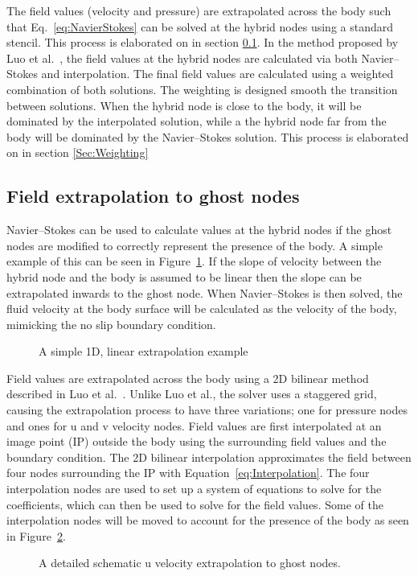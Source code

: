 \documentclass[onehalf,11pt]{beavtex}
\begin{document}
The field values (velocity and pressure) are extrapolated across the body such that Eq.~\eqref{eq:NavierStokes} can be solved at the hybrid nodes using a standard stencil. 
This process is elaborated on in section \ref{Sec:Field Extrapolation}. 
In the method proposed by Luo et al.~\cite{Luo:2012gx}, the field values at the hybrid nodes are calculated via both Navier--Stokes and interpolation. 
The final field values are calculated using a weighted combination of both solutions.
The weighting is designed smooth the transition between solutions. 
When the hybrid node is close to the body, it will be dominated by the interpolated solution, while a the hybrid node far from the body will be dominated by the Navier--Stokes solution. 
This process is elaborated on in section \ref{Sec:Weighting}

\subsection{Field extrapolation to ghost nodes}
\label{Sec:Field Extrapolation}

Navier--Stokes can be used to calculate values at the hybrid nodes if the ghost nodes are modified to correctly represent the presence of the body.
A simple example of this can be seen in Figure~\ref{Fig: Simple Interpolation}.
If the slope of velocity between the hybrid node and the body is assumed to be linear then the slope can be extrapolated inwards to the ghost node.
When Navier--Stokes is then solved, the fluid velocity at the body surface will be calculated as the velocity of the body, mimicking the no slip boundary condition.
\begin{figure}[htb]
	\centering
	
	\caption{A simple 1D, linear extrapolation example}
	\label{Fig: Simple Interpolation}
\end{figure}

Field values are extrapolated across the body using a 2D bilinear method described in Luo et al.~\cite{Luo:2012gx}.
Unlike Luo et al., the solver uses a staggered grid, causing the extrapolation process to have three variations; one for pressure nodes and ones for u and v velocity nodes.
Field values are first interpolated at an image point (IP) outside the body using the surrounding field values and the boundary condition. 
The 2D bilinear interpolation approximates the field between four nodes surrounding the IP with Equation~\eqref{eq:Interpolation}.
The four interpolation nodes are used to set up a system of equations to solve for the coefficients, which can then be used to solve for the field values. 
Some of the interpolation nodes will be moved to account for the presence of the body as seen in Figure~\ref{fig:Ghost node extrapolation}.
\begin{figure}[htb]
	\centering
	
	\caption{A detailed schematic u velocity extrapolation to ghost nodes.}
	\label{fig:Ghost node extrapolation}
\end{figure}
\end{document}
